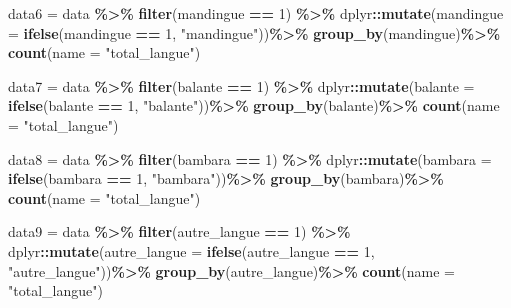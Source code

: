 \documentclass[
]{article}
\newenvironment{Shaded}{\begin{snugshade}}{\end{snugshade}}
\newcommand{\AttributeTok}[1]{\textcolor[rgb]{0.13,0.29,0.53}{#1}}
\newcommand{\DecValTok}[1]{\textcolor[rgb]{0.00,0.00,0.81}{#1}}
\newcommand{\FunctionTok}[1]{\textcolor[rgb]{0.13,0.29,0.53}{\textbf{#1}}}
\newcommand{\NormalTok}[1]{#1}
\newcommand{\OtherTok}[1]{\textcolor[rgb]{0.56,0.35,0.01}{#1}}
\newcommand{\SpecialCharTok}[1]{\textcolor[rgb]{0.81,0.36,0.00}{\textbf{#1}}}
\newcommand{\StringTok}[1]{\textcolor[rgb]{0.31,0.60,0.02}{#1}}
\begin{document}
\begin{Shaded}
\begin{Highlighting}[]
\NormalTok{data6 }\OtherTok{=}\NormalTok{  data }\SpecialCharTok{\%\textgreater{}\%}
\FunctionTok{filter}\NormalTok{(mandingue  }\SpecialCharTok{==} \DecValTok{1}\NormalTok{) }\SpecialCharTok{\%\textgreater{}\%} 
\NormalTok{  dplyr}\SpecialCharTok{::}\FunctionTok{mutate}\NormalTok{(}\AttributeTok{mandingue  =} \FunctionTok{ifelse}\NormalTok{(mandingue  }\SpecialCharTok{==} \DecValTok{1}\NormalTok{, }\StringTok{"mandingue"}\NormalTok{))}\SpecialCharTok{\%\textgreater{}\%} 
  \FunctionTok{group\_by}\NormalTok{(mandingue)}\SpecialCharTok{\%\textgreater{}\%} 
  \FunctionTok{count}\NormalTok{(}\AttributeTok{name =} \StringTok{"total\_langue"}\NormalTok{)}


\NormalTok{data7 }\OtherTok{=}\NormalTok{  data }\SpecialCharTok{\%\textgreater{}\%}
\FunctionTok{filter}\NormalTok{(balante  }\SpecialCharTok{==} \DecValTok{1}\NormalTok{) }\SpecialCharTok{\%\textgreater{}\%} 
\NormalTok{  dplyr}\SpecialCharTok{::}\FunctionTok{mutate}\NormalTok{(}\AttributeTok{balante  =} \FunctionTok{ifelse}\NormalTok{(balante }\SpecialCharTok{==} \DecValTok{1}\NormalTok{, }\StringTok{"balante"}\NormalTok{))}\SpecialCharTok{\%\textgreater{}\%} 
  \FunctionTok{group\_by}\NormalTok{(balante)}\SpecialCharTok{\%\textgreater{}\%} 
  \FunctionTok{count}\NormalTok{(}\AttributeTok{name =} \StringTok{"total\_langue"}\NormalTok{)}

\NormalTok{data8 }\OtherTok{=}\NormalTok{  data }\SpecialCharTok{\%\textgreater{}\%}
\FunctionTok{filter}\NormalTok{(bambara  }\SpecialCharTok{==} \DecValTok{1}\NormalTok{) }\SpecialCharTok{\%\textgreater{}\%}
\NormalTok{  dplyr}\SpecialCharTok{::}\FunctionTok{mutate}\NormalTok{(}\AttributeTok{bambara  =} \FunctionTok{ifelse}\NormalTok{(bambara }\SpecialCharTok{==} \DecValTok{1}\NormalTok{, }\StringTok{"bambara"}\NormalTok{))}\SpecialCharTok{\%\textgreater{}\%} 
  \FunctionTok{group\_by}\NormalTok{(bambara)}\SpecialCharTok{\%\textgreater{}\%} 
  \FunctionTok{count}\NormalTok{(}\AttributeTok{name =} \StringTok{"total\_langue"}\NormalTok{)}

\NormalTok{data9 }\OtherTok{=}\NormalTok{  data }\SpecialCharTok{\%\textgreater{}\%}
\FunctionTok{filter}\NormalTok{(autre\_langue  }\SpecialCharTok{==} \DecValTok{1}\NormalTok{) }\SpecialCharTok{\%\textgreater{}\%} 
\NormalTok{  dplyr}\SpecialCharTok{::}\FunctionTok{mutate}\NormalTok{(}\AttributeTok{autre\_langue  =} \FunctionTok{ifelse}\NormalTok{(autre\_langue }\SpecialCharTok{==} \DecValTok{1}\NormalTok{, }\StringTok{"autre\_langue"}\NormalTok{))}\SpecialCharTok{\%\textgreater{}\%}
  \FunctionTok{group\_by}\NormalTok{(autre\_langue)}\SpecialCharTok{\%\textgreater{}\%} 
  \FunctionTok{count}\NormalTok{(}\AttributeTok{name =} \StringTok{"total\_langue"}\NormalTok{)}



\end{Highlighting}
\end{Shaded}
\end{document}
